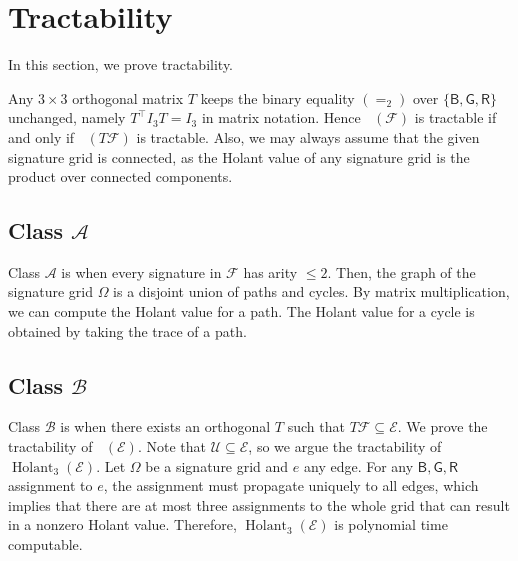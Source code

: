\documentclass[11pt]{article}
\DeclareMathOperator{\hol}{Holant}
\DeclareMathOperator{\holts}{Holant^*_3}
\newcommand{\db}{\mathsf{B}}
\newcommand{\dg}{\mathsf{G}}
\newcommand{\dr}{\mathsf{R}}
\newcommand{\transpose}{^\intercal}
\newcommand{\tractbinary}{$\mathscr{A}$\xspace}
\newcommand{\tractE}{$\mathscr{B}$\xspace}
\begin{document}
%
 
\section{Tractability}
In this section, we prove tractability.

Any $3 \times 3$ orthogonal matrix $T$ keeps the binary equality $(=_2)$ over $\{\db, \dg, \dr\}$ unchanged, namely $T\transpose I_3 T = I_3$ in matrix notation.
Hence $\holts(\mathcal{F})$ is tractable if and only if $\holts(T \mathcal{F})$ is tractable. 
Also, we may always assume that the given signature grid is connected,
as the Holant value of any signature grid is the product over connected components.



\subsection{Class \texorpdfstring{\tractbinary}{A}}
Class \tractbinary is when every signature in $\mathcal{F}$ has arity $\le 2$.
Then, the graph of the signature grid $\Omega$ is a disjoint union of paths and cycles. By matrix multiplication, we can compute the Holant value for a path. 
The Holant value for a cycle is obtained by taking the trace of a path.


\subsection{Class \texorpdfstring{\tractE}{B}}
Class \tractE is when there exists an orthogonal $T$ such that $T \mathcal{F} \subseteq \mathcal{E}$.
We prove the tractability of $\holts(\mathcal{E})$.
Note that $\mathcal{U} \subseteq \mathcal{E}$, so we argue the tractability of $\hol_3(\mathcal{E})$.
Let $\Omega$ be a signature grid and $e$ any edge.
For any $\db, \dg, \dr$ assignment to $e$, the assignment must propagate uniquely to all edges, which implies that there are at most three assignments to the whole grid that can result in a nonzero Holant value.
Therefore, $\hol_3(\mathcal{E})$ is polynomial time computable.
\end{document}
